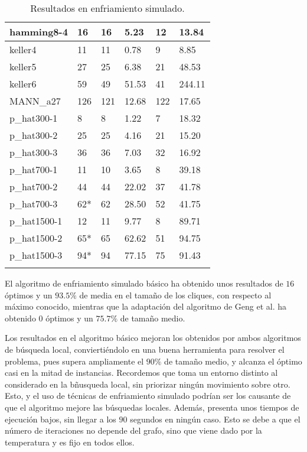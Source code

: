 \begin{small}
\begin{longtable}{l l l l l l}
    hamming8-4         & 16 & 16 & 5.23 & 12 & 13.84 \\ \hline
    keller4            & 11 & 11 & 0.78 & 9 & 8.85 \\ \hline
    keller5            & 27 & 25 & 6.38 & 21 & 48.53 \\ \hline
    keller6            & 59 & 49 & 51.53 & 41 & 244.11 \\ \hline
    MANN\_a27          & 126 & 121 & 12.68 & 122 & 17.65 \\ \hline
    p\_hat300-1        & 8 & 8 & 1.22 & 7 & 18.32 \\ \hline
    p\_hat300-2        & 25 & 25 & 4.16 & 21 & 15.20 \\ \hline
    p\_hat300-3        & 36 & 36 & 7.03 & 32 & 16.92 \\ \hline
    p\_hat700-1        & 11 & 10 & 3.65 & 8 & 39.18 \\ \hline
    p\_hat700-2        & 44 & 44 & 22.02 & 37 & 41.78 \\ \hline
    p\_hat700-3        & 62* & 62 & 28.50 & 52 & 41.75 \\ \hline
    p\_hat1500-1       & 12 & 11 & 9.77 & 8 & 89.71 \\ \hline
    p\_hat1500-2       & 65* & 65 & 62.62 & 51 & 94.75 \\ \hline
    p\_hat1500-3       & 94* & 94 & 77.15 & 75 & 91.43 \\ \hline
  \caption{Resultados en enfriamiento simulado.}
\end{longtable}
\end{small}

El algoritmo de enfriamiento simulado básico ha obtenido unos resultados de $16$
óptimos y un $93.5\%$ de media en el tamaño de los cliques, con respecto al máximo
conocido, mientras que la adaptación del algoritmo de Geng et al. ha obtenido
$0$ óptimos y un $75.7\%$ de tamaño medio.

Los resultados en el algoritmo básico mejoran los obtenidos por ambos algoritmos
de búsqueda local, conviertiéndolo en una buena herramienta para resolver el problema,
pues supera ampliamente el $90\%$ de tamaño medio, y alcanza el óptimo casi en la
mitad de instancias. Recordemos que toma un entorno distinto al considerado en la
bñusqueda local, sin priorizar ningún movimiento sobre otro. Esto, y el uso de
técnicas de enfriamiento simulado podrían ser los causante de que el algoritmo
mejore las búsquedas locales. Además, presenta unos tiempos de ejecución bajos,
sin llegar a los $90$ segundos en ningún caso. Esto se debe a que el número de
iteraciones no depende del grafo, sino que viene dado por la temperatura y es
fijo en todos ellos.

